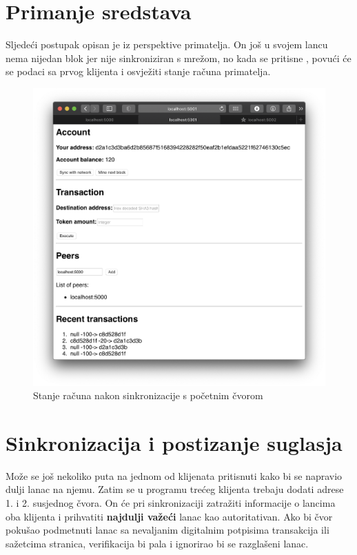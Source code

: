 \documentclass[utf8, zavrsni]{fer}
\begin{document}
\section{Primanje sredstava}
Sljedeći postupak opisan je iz perspektive primatelja. On još u svojem lancu nema nijedan blok jer nije sinkroniziran s mrežom, no kada se pritisne , povući će se podaci sa prvog klijenta i osvježiti stanje računa primatelja.
\begin{figure}[H]
    \centering
    \includegraphics[width=\textwidth]{sinkronizacija.png}
    \caption{Stanje računa nakon sinkronizacije s početnim čvorom}
    \label{fig:sinkronizacija}
\end{figure}

\newpage
\section{Sinkronizacija i postizanje suglasja}
Može se još nekoliko puta na jednom od klijenata pritisnuti  kako bi se napravio dulji lanac na njemu. Zatim se u programu trećeg klijenta trebaju dodati adrese 1. i 2. susjednog čvora. On će pri sinkronizaciji zatražiti informacije o lancima oba klijenta i prihvatiti \textbf{najdulji važeći} lanac kao autoritativan. Ako bi čvor pokušao podmetnuti lanac sa nevaljanim digitalnim potpisima transakcija ili sažetcima stranica, verifikacija bi pala i ignorirao bi se razglašeni lanac.
\end{document}
